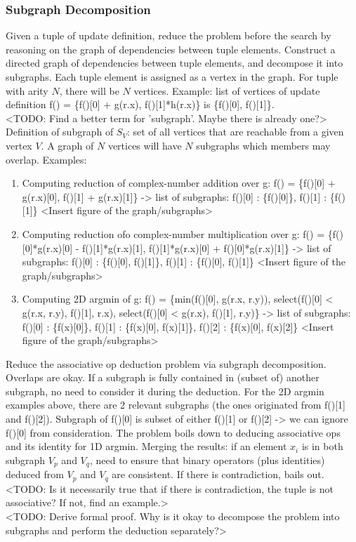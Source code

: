 \subsubsection{Subgraph Decomposition}

Given a tuple of update definition, reduce the problem before the search by reasoning on the graph of dependencies between tuple elements. Construct a directed graph of dependencies between tuple elements, and decompose it into subgraphs. Each tuple element is assigned as a vertex in the graph. For tuple with arity $N$, there will be $N$ vertices. Example: list of vertices of update definition f() = \{f()[0] + g(r.x), f()[1]*h(r.x)\} is \{f()[0], f()[1]\}. \\

<TODO: Find a better term for 'subgraph'. Maybe there is already one?> \\

Definition of subgraph of $S_V$: set of all vertices that are reachable from a given vertex $V$. A graph of $N$ vertices will have $N$ subgraphs which members may overlap. Examples: 
\begin{enumerate}
 \item Computing reduction of complex-number addition over g: f() = \{f()[0] + g(r.x)[0], f()[1] + g(r.x)[1]\} -> list of subgraphs: f()[0] : \{f()[0]\}, f()[1] : \{f()[1]\} <Insert figure of the graph/subgraphs>
 \item Computing reduction ofo complex-number multiplication over g: f() = \{f()[0]*g(r.x)[0] - f()[1]*g(r.x)[1], f()[1]*g(r.x)[0] + f()[0]*g(r.x)[1]\} -> list of subgraphs: f()[0] : \{f()[0], f()[1]\}, f()[1] : \{f()[0], f()[1]\} <Insert figure of the graph/subgraphs>
 \item Computing 2D argmin of g: f() = \{min(f()[0], g(r.x, r.y)), select(f()[0] < g(r.x, r.y), f()[1], r.x), select(f()[0] < g(r.x), f()[1], r.y)\} -> list of subgraphs: f()[0] : \{f(x)[0]\}, f()[1] : \{f(x)[0], f(x)[1]\}, f()[2] : \{f(x)[0], f(x)[2]\} <Insert figure of the graph/subgraphs>
\end{enumerate}

Reduce the associative op deduction problem via subgraph decomposition. Overlaps are okay. If a subgraph is fully contained in (subset of) another subgraph, no need to consider it during the deduction. For the 2D argmin examples above, there are 2 relevant subgraphs (the ones originated from f()[1] and f()[2]). Subgraph of f()[0] is subset of either f()[1] or f()[2] -> we can ignore f()[0] from consideration. The problem boils down to deducing associative ops and its identity for 1D argmin. Merging the results: if an element $x_i$ is in both subgraph $V_p$ and $V_q$, need to ensure that binary operators (plus identities) deduced from $V_p$ and $V_q$ are consistent. If there is contradiction, bails out. <TODO: Is it necessarily true that if there is contradiction, the tuple is not associative? If not, find an example.> \\

<TODO: Derive formal proof. Why is it okay to decompose the problem into subgraphs and perform the deduction separately?> \\
